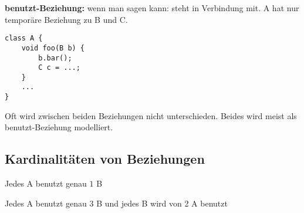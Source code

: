 \documentclass[12pt, oneside]{article}   	%
\begin{document}
\textbf{benutzt-Beziehung:} wenn man sagen kann:  \glqq steht in Verbindung mit\grqq. A hat nur tempor\"are Beziehung zu B und C.

\begin{lstlisting}[frame=single]
class A {
	void foo(B b) {
		b.bar();
		C c = ...;
	}
	...
}
\end{lstlisting}

\begin{center}
\end{center}

\vspace{1cm}
Oft wird zwischen beiden Beziehungen nicht unterschieden. Beides wird meist als benutzt-Beziehung modelliert.

\subsection{Kardinalit\"aten von Beziehungen}

\begin{center}
Jedes A benutzt genau $1$ B \\ \vspace{0.5cm}
\end{center}

\begin{center}
Jedes A benutzt genau $3$ B und jedes B wird von 2 A benutzt \\ \vspace{0.5cm}
\end{center}
\end{document}

